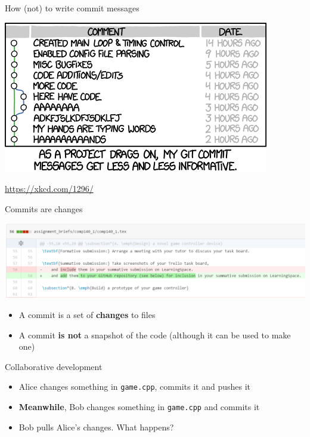 \begin{frame}{How (not) to write commit messages}
    \begin{center}
        \includegraphics[height=0.4\textheight]{xkcd1296}
        
        {\tiny\url{https://xkcd.com/1296/}}
    \end{center}
\end{frame}

\begin{frame}{Commits are changes}
    \begin{center}
        \includegraphics[width=\textwidth]{diff}
    \end{center}

    \begin{itemize}
        \item A commit is a set of \textbf{changes} to files \pause
        \item A commit \textbf{is not} a snapshot of the code (although it can be used to make one)
    \end{itemize}
\end{frame}

\begin{frame}{Collaborative development}
    \begin{itemize}
        \item Alice changes something in \texttt{game.cpp}, commits it and pushes it \pause
        \item \textbf{Meanwhile}, Bob changes something in \texttt{game.cpp} and commits it \pause
        \item Bob pulls Alice's changes. What happens?
    \end{itemize}
\end{frame}

